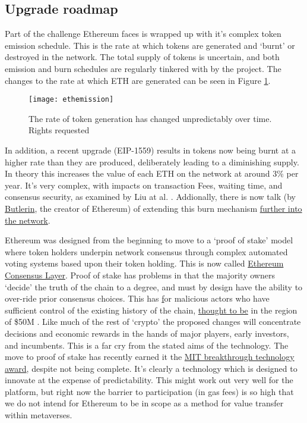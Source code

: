 \subsection{Upgrade roadmap}
Part of the challenge Ethereum faces is wrapped up with it's complex token emission schedule. This is the rate at which tokens are generated and `burnt' or destroyed in the network. The total supply of tokens is uncertain, and both emission and burn schedules are regularly tinkered with by the project. The changes to the rate at which ETH are generated can be seen in Figure \ref{fig:ethemission}.
\begin{figure}
  \centering
    \texttt{[image: ethemission]}
  \caption{The rate of token generation has changed unpredictably over time. Rights requested}
  \label{fig:ethemission}
\end{figure}
In addition, a recent upgrade (EIP-1559) results in tokens now being burnt at a higher rate than they are produced, deliberately leading to a diminishing supply. In theory this increases the value of each ETH on the network at around 3\% per year. It's very complex, with impacts on transaction Fees, waiting time, and consensus security, as examined by Liu at al. \cite{liu2022empirical}. Addionally, there is now talk (by \href{https://time.com/6158182/vitalik-buterin-ethereum-profile/}{Butlerin}, the creator of Ethereum) of extending this burn mechanism \href{https://ethresear.ch/t/multidimensional-eip-1559/11651}{further into the network}.\par
Ethereum was designed from the beginning to move to a `proof of stake' model where token holders underpin network consensus through complex automated voting systems based upon their token holding. This is now called \href{https://blog.ethereum.org/2022/01/24/the-great-eth2-renaming/}{Ethereum Consensus Layer}. Proof of stake has problems in that the majority owners `decide' the truth of the chain to a degree, and must by design have the ability to over-ride prior consensus choices. This has \href{https://notes.ethereum.org/@djrtwo/risks-of-lsd} for malicious actors who have sufficient control of the existing history of the chain, \href{https://twitter.com/MTorgin/status/1521433474820890624}{thought to be} in the region of \$50M \cite{mackinga2022twap}. Like much of the rest of `crypto' the proposed changes will concentrate decisions and economic rewards in the hands of major players, early investors, and incumbents. This is a far cry from the stated aims of the technology. The move to proof of stake has recently earned it the \href{https://www.technologyreview.com/2022/02/23/1044960/proof-of-stake-cryptocurrency/}{MIT breakthrough technology award}, despite not being complete. It's clearly a technology which is designed to innovate at the expense of predictability. This might work out very well for the platform, but right now the barrier to participation (in gas fees) is so high that we do not intend for Ethereum to be in scope as a method for value transfer within metaverses.\par


